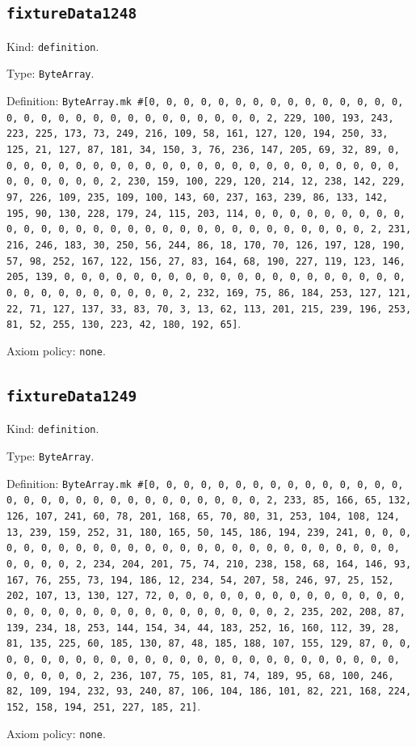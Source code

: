 \documentclass[11pt]{article}
\begin{document}
\subsection*{\texttt{fixtureData1248}}
\noindent Kind: \texttt{definition}.\par
\noindent Type: \texttt{ByteArray}.\par
\noindent Definition: \texttt{ByteArray.mk \#[0, 0, 0, 0, 0, 0, 0, 0, 0, 0, 0, 0, 0, 0, 0, 0, 0, 0, 0, 0, 0, 0, 0, 0, 0, 0, 0, 0, 0, 0, 2, 229, 100, 193, 243, 223, 225, 173, 73, 249, 216, 109, 58, 161, 127, 120, 194, 250, 33, 125, 21, 127, 87, 181, 34, 150, 3, 76, 236, 147, 205, 69, 32, 89, 0, 0, 0, 0, 0, 0, 0, 0, 0, 0, 0, 0, 0, 0, 0, 0, 0, 0, 0, 0, 0, 0, 0, 0, 0, 0, 0, 0, 0, 0, 2, 230, 159, 100, 229, 120, 214, 12, 238, 142, 229, 97, 226, 109, 235, 109, 100, 143, 60, 237, 163, 239, 86, 133, 142, 195, 90, 130, 228, 179, 24, 115, 203, 114, 0, 0, 0, 0, 0, 0, 0, 0, 0, 0, 0, 0, 0, 0, 0, 0, 0, 0, 0, 0, 0, 0, 0, 0, 0, 0, 0, 0, 0, 0, 2, 231, 216, 246, 183, 30, 250, 56, 244, 86, 18, 170, 70, 126, 197, 128, 190, 57, 98, 252, 167, 122, 156, 27, 83, 164, 68, 190, 227, 119, 123, 146, 205, 139, 0, 0, 0, 0, 0, 0, 0, 0, 0, 0, 0, 0, 0, 0, 0, 0, 0, 0, 0, 0, 0, 0, 0, 0, 0, 0, 0, 0, 0, 0, 2, 232, 169, 75, 86, 184, 253, 127, 121, 22, 71, 127, 137, 33, 83, 70, 3, 13, 62, 113, 201, 215, 239, 196, 253, 81, 52, 255, 130, 223, 42, 180, 192, 65]}.\par
\noindent Axiom policy: \texttt{none}.\par
\subsection*{\texttt{fixtureData1249}}
\noindent Kind: \texttt{definition}.\par
\noindent Type: \texttt{ByteArray}.\par
\noindent Definition: \texttt{ByteArray.mk \#[0, 0, 0, 0, 0, 0, 0, 0, 0, 0, 0, 0, 0, 0, 0, 0, 0, 0, 0, 0, 0, 0, 0, 0, 0, 0, 0, 0, 0, 0, 2, 233, 85, 166, 65, 132, 126, 107, 241, 60, 78, 201, 168, 65, 70, 80, 31, 253, 104, 108, 124, 13, 239, 159, 252, 31, 180, 165, 50, 145, 186, 194, 239, 241, 0, 0, 0, 0, 0, 0, 0, 0, 0, 0, 0, 0, 0, 0, 0, 0, 0, 0, 0, 0, 0, 0, 0, 0, 0, 0, 0, 0, 0, 0, 2, 234, 204, 201, 75, 74, 210, 238, 158, 68, 164, 146, 93, 167, 76, 255, 73, 194, 186, 12, 234, 54, 207, 58, 246, 97, 25, 152, 202, 107, 13, 130, 127, 72, 0, 0, 0, 0, 0, 0, 0, 0, 0, 0, 0, 0, 0, 0, 0, 0, 0, 0, 0, 0, 0, 0, 0, 0, 0, 0, 0, 0, 0, 0, 2, 235, 202, 208, 87, 139, 234, 18, 253, 144, 154, 34, 44, 183, 252, 16, 160, 112, 39, 28, 81, 135, 225, 60, 185, 130, 87, 48, 185, 188, 107, 155, 129, 87, 0, 0, 0, 0, 0, 0, 0, 0, 0, 0, 0, 0, 0, 0, 0, 0, 0, 0, 0, 0, 0, 0, 0, 0, 0, 0, 0, 0, 0, 0, 2, 236, 107, 75, 105, 81, 74, 189, 95, 68, 100, 246, 82, 109, 194, 232, 93, 240, 87, 106, 104, 186, 101, 82, 221, 168, 224, 152, 158, 194, 251, 227, 185, 21]}.\par
\noindent Axiom policy: \texttt{none}.\par
\end{document}
